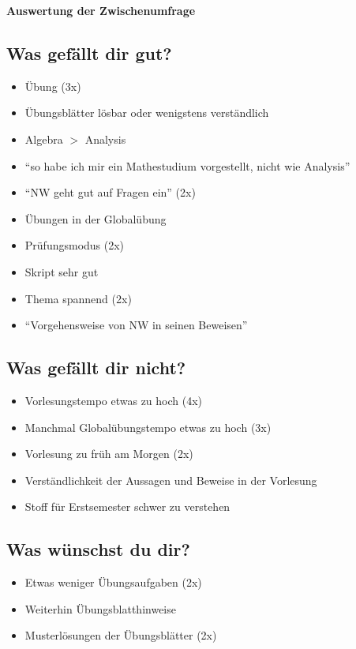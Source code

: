 \documentclass[16pt,a4paper,ngerman]{scrartcl}
\begin{document}
\begin{center}\Large\sffamily\textbf{Auswertung der Zwischenumfrage}\end{center}

\subsection*{Was gefällt dir gut?}

\begin{itemize}
  \item Übung (3x)
  \item Übungsblätter lösbar oder wenigstens verständlich
  \item Algebra $>$ Analysis
  \item "`so habe ich mir ein Mathestudium vorgestellt, nicht wie Analysis"'
  \item "`NW geht gut auf Fragen ein"' (2x)
  \item Übungen in der Globalübung
  \item Prüfungsmodus (2x)
  \item Skript sehr gut
  \item Thema spannend (2x)
  \item "`Vorgehensweise von NW in seinen Beweisen"'
\end{itemize}

\subsection*{Was gefällt dir nicht?}

\begin{itemize}
  \item Vorlesungstempo etwas zu hoch (4x)
  \item Manchmal Globalübungstempo etwas zu hoch (3x)
  \item Vorlesung zu früh am Morgen (2x)
  \item Verständlichkeit der Aussagen und Beweise in der Vorlesung
  \item Stoff für Erstsemester schwer zu verstehen
\end{itemize}

\subsection*{Was wünschst du dir?}

\begin{itemize}
  \item Etwas weniger Übungsaufgaben (2x)
  \item Weiterhin Übungsblatthinweise
  \item Musterlösungen der Übungsblätter (2x)
\end{itemize}

\end{document}
